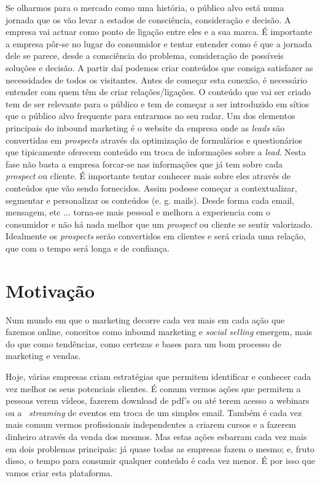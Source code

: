 Se olharmos para o mercado como uma história, o público alvo está numa jornada que os vão levar a estados de consciência, consideração e decisão. A empresa vai actuar como ponto de ligação entre eles e a sua marca.
É importante a empresa pôr-se no lugar do consumidor e tentar entender como é que a jornada dele se parece, desde a consciência do problema, consideração de possíveis soluções e decisão. A partir daí podemos criar conteúdos que consiga satisfazer as necessidades de todos os visitantes.
Antes de começar esta conexão, é necessário entender com quem têm de criar relações/ligações. O conteúdo que vai ser criado tem de ser relevante para o público e tem de começar a ser introduzido em sítios que o público alvo frequente para entrarmos no seu radar. 
Um dos elementos principais do inbound marketing é o website da empresa onde as \textit{leads} são convertidas em \textit{prospects} através da optimização de formulários e questionários que tipicamente oferecem conteúdo em troca de informações sobre a \textit{lead}. 
Nesta fase não basta a empresa forcar-se nas informações que já tem sobre cada \textit{prospect} ou cliente. É importante tentar conhecer mais sobre eles através de conteúdos que vão sendo fornecidos. Assim podesse começar a contextualizar, segmentar e personalizar os conteúdos (e. g. mails). Desde forma cada email, mensagem, etc ... torna-se mais pessoal e melhora a experiencia com o consumidor e não há nada melhor que um \textit{prospect} ou cliente se sentir valorizado.
Idealmente os \textit{prospects} serão convertidos em clientes e será criada uma relação, que com o tempo será longa e de confiança.



\section{Motivação}
\label{subsec:motivacao}

Num mundo em que o marketing decorre cada vez mais em cada ação que fazemos online, conceitos como inbound marketing e \textit{\gls{social selling}} emergem, mais do que como tendências, como certezas e bases para um bom processo de marketing e vendas.

Hoje, várias empresas criam estratégias que permitem identificar e conhecer cada vez melhor os seus potenciais clientes. É comum vermos ações que permitem a pessoas verem vídeos, fazerem download de pdf's ou até terem acesso a \gls{webinars} ou a ~\textit{streaming} de eventos em troca de um simples email. Também é cada vez mais comum vermos profissionais independentes a criarem cursos e a fazerem dinheiro através da venda dos mesmos.
Mas estas ações esbarram cada vez mais em dois problemas principais: já quase todas as empresas fazem o mesmo; e, fruto disso, o tempo para consumir qualquer conteúdo é cada vez menor.
É por isso que vamos criar esta plataforma. 

